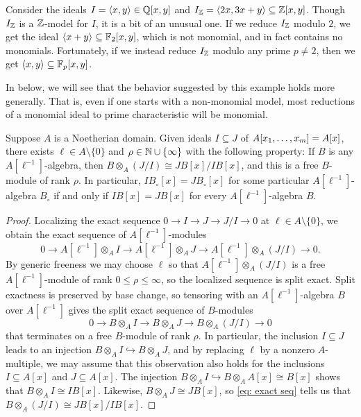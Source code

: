 \documentclass{amsart}
\begin{document}
\begin{example}
   Consider the ideals $I=\langle x, y \rangle \in \mathbb{Q}[x,y]$ and $I_{\mathbb{Z}} = \langle 2x, 3x+y \rangle \subseteq \mathbb{Z}[x,y]$.
   Though $I_{\mathbb{Z}}$ is a $\mathbb{Z}$-model for $I$, it is a bit of an unusual one.
   If we reduce $I_{\mathbb{Z}}$ modulo $2$, we get the ideal $\langle x+y \rangle \subseteq \mathbb{F}_2[x,y]$, which is not monomial, and in fact contains no monomials.  Fortunately, if we instead reduce $I_{\mathbb{Z}}$ modulo any prime $p \neq 2$, then we get $\langle x, y \rangle \subseteq \mathbb{F}_p[x,y]$.
\end{example}

In  below, we will see that the behavior suggested by this example holds more generally.  That is, even if one starts with a non-monomial model, most reductions of a monomial ideal to prime characteristic will be monomial.

\begin{proposition}
   \label{comparing expansions:  P}
   Suppose $A$ is a Noetherian domain.
   Given ideals $I \subseteq J$ of $A[x_1, \ldots, x_m] = A[x]$, there exists $\ell \in A\setminus\{0\}$ and $\rho \in \mathbb{N} \cup \{ \infty \}$ with the following property\textup:
   If $B$ is any $A[\ell^{-1}]$-algebra, then $B \otimes_A (J/I) \cong JB[x]/IB[x]$, and this is a free $B$-module of rank $\rho$.
   In particular, $IB_{\circ}[x]=JB_{\circ}[x]$ for some particular $A[\ell^{-1}]$-algebra $B_{\circ}$ if and only if $IB[x]=JB[x]$ for every $A[\ell^{-1}]$-algebra $B$.
\end{proposition}

\begin{proof}
   Localizing the exact sequence $0 \to I \to J \to J/I \to 0$ at $\ell \in A \setminus \{0\}$, we obtain the exact sequence of $A[\ell^{-1}]$-modules
   \[0 \to A[\ell^{-1}] \otimes_A I \to A[\ell^{-1}] \otimes_A J \to A[\ell^{-1}] \otimes_A (J/I) \to 0.\]
   By generic freeness we may choose $\ell$ so that $A[\ell^{-1}] \otimes_A (J/I)$ is a free $A[\ell^{-1}]$-module of rank $0 \leq \rho \leq \infty$, so the localized sequence is split exact.
   Split exactness is preserved by base change, so tensoring with an $A[\ell^{-1}]$-algebra $B$ over $A[\ell^{-1}]$ gives the split exact sequence of $B$-modules 
   \begin{equation}
      \label{eq: exact seq}
      0 \to B \otimes_A I \to B \otimes_A J \to B \otimes_A (J/I) \to 0
   \end{equation}
   that terminates on a free $B$-module of rank $\rho$.
   In particular, the inclusion $I \subseteq J$ leads to an injection $B\otimes_A I \hookrightarrow B\otimes_A J$, and by replacing $\ell$ by a nonzero $A$-multiple, we may assume that this observation also holds for the inclusions $I\subseteq A[x]$ and $J \subseteq A[x]$.
   The injection $B\otimes_A I \hookrightarrow B\otimes_A A[x] \cong B[x]$ shows that $B \otimes_A I \cong I B[x]$.
   Likewise, $B \otimes_A J \cong JB[x]$, so \eqref{eq: exact seq} tells us that $B \otimes_A (J/I) \cong J B[x]/I B[x]$.
\end{proof}
\end{document}

